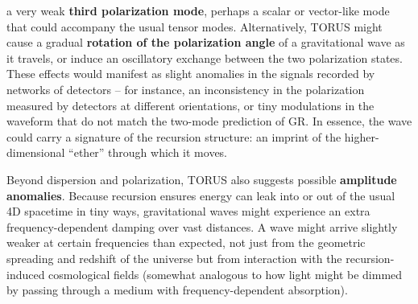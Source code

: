 \documentclass[
]{article}
\begin{document}
\begin{itemize}
  a very weak \textbf{third polarization mode}, perhaps a scalar or
  vector-like mode that could accompany the usual tensor
  modes\hspace{0pt}. Alternatively, TORUS might cause a gradual
  \textbf{rotation of the polarization angle} of a gravitational wave as
  it travels, or induce an oscillatory exchange between the two
  polarization states. These effects would manifest as slight anomalies
  in the signals recorded by networks of detectors -- for instance, an
  inconsistency in the polarization measured by detectors at different
  orientations, or tiny modulations in the waveform that do not match
  the two-mode prediction of GR. In essence, the wave could carry a
  signature of the recursion structure: an imprint of the
  higher-dimensional ``ether'' through which it moves.
\end{itemize}

Beyond dispersion and polarization, TORUS also suggests possible
\textbf{amplitude anomalies}. Because recursion ensures energy can leak
into or out of the usual 4D spacetime in tiny ways, gravitational waves
might experience an extra frequency-dependent damping over vast
distances\hspace{0pt}. A wave might arrive slightly weaker at certain
frequencies than expected, not just from the geometric spreading and
redshift of the universe but from interaction with the recursion-induced
cosmological fields (somewhat analogous to how light might be dimmed by
passing through a medium with frequency-dependent absorption).
\end{document}

